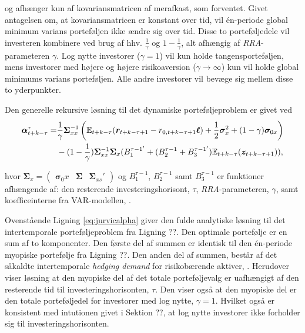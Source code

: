 \documentclass[
  a4paper,
  oneside]{memoir}
\begin{document}
og afhænger kun af kovariansmatricen af merafkast, som forventet. Givet antagelsen om, at kovariansmatricen er konstant over tid, vil én-periode global minimum varians porteføljen ikke ændre sig over tid. Disse to porteføljedele vil investeren kombinere ved brug af hhv. \(\tfrac{1}{\gamma}\) og \(1-\tfrac{1}{\gamma}\), alt afhængig af \emph{RRA}-parameteren \(\gamma\). Log nytte investorer (\(\gamma=1\)) vil kun holde tangensporteføljen, mens investorer med højere og højere risikoaversion (\(\gamma\to\infty\)) kun vil holde global minimums varians porteføljen. Alle andre investorer vil bevæge sig mellem disse to yderpunkter.

Den generelle rekursive løsning til det dynamiske porteføljeproblem er givet ved
\begin{align}
\bm{\alpha}_{t+k-\tau}^\tau = &\frac{1}{\gamma} \bm{\Sigma}_{xx}^{-1} \left( \mathbb{E}_{t+k-\tau} ( \bm{r}_{t+k-\tau+1} - r_{0,t+k-\tau+1} \bm{\ell} ) + \frac{1}{2} \bm{\sigma}_x^2 + (1-\gamma) \bm{\sigma}_{0x} \right) \notag\\
&- (1-\frac{1}{\gamma} ) \bm{\Sigma}_{xx}^{-1} \bm{\Sigma}_x (B_1^{\tau-1'}+(B_2^{\tau-1}+B_3^{\tau-1'})\mathbb{E}_{t+k-\tau}(\bm{z}_{t+k-\tau+1})),\label{eq:jurvicalpha}
\end{align}

hvor \(\bm{\Sigma}_x=\begin{pmatrix}\bm{\sigma}_0x & \bm{\Sigma} & \bm{\Sigma}_{xs}'\end{pmatrix}\) og \(B_1^{\tau-1}\), \(B_2^{\tau-1}\) samt \(B_3^{\tau-1}\) er funktioner afhængende af: den resterende investeringshorisont, \(\tau\), \emph{RRA}-parameteren, \(\gamma\), samt koefficeinterne fra VAR-modellen, \citep{JurVic2011}.

Ovenstående Ligning \eqref{eq:jurvicalpha} giver den fulde analytiske løsning til det intertemporale porteføljeproblem fra Ligning ??. Den optimale portefølje er en sum af to komponenter. Den første del af summen er identisk til den én-periode myopiske portefølje fra Ligning ??. Den anden del af summen, består af det såkaldte intertemporale \emph{hedging demand} for risikobærende aktiver, \citep{Merton1969, Merton1971, Merton1973}. Herudover viser løsning at den myopiske del af det totale porteføljevalg er uafhængigt af den resterende tid til investeringshorisonten, \(\tau\). Den viser også at den myopiske del er den totale porteføljedel for investorer med log nytte, \(\gamma=1\). Hvilket også er konsistent med intutionen givet i Sektion ??, at log nytte investorer ikke forholder sig til investeringshorisonten.
\end{document}
